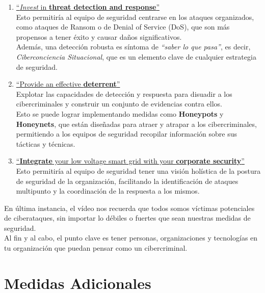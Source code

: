 \begin{enumerate}
   \item \ul{``\textit{Invest} in \textbf{threat detection and response}''}\\
   Esto permitiría al equipo de seguridad centrarse en los ataques organizados, como ataques de Ransom o de Denial of Service (DoS), que son más propensos a tener éxito y causar daños significativos.\\
   Además, una detección robusta es síntoma de \textit{``saber lo que pasa''}, es decir, \textit{Ciberconciencia Situacional}, que es un elemento clave de cualquier estrategia de seguridad.
   \item \ul{``Provide an effective \textbf{deterrent}''}\\
   Explotar las capacidades de detección y respuesta para disuadir a los cibercriminales y construir un conjunto de evidencias contra ellos.\\
   Esto se puede lograr implementando medidas como \textbf{Honeypots} y \textbf{Honeynets}, que están diseñadas para atraer y atrapar a los cibercriminales, permitiendo a los equipos de seguridad recopilar información sobre sus tácticas y técnicas.
   \item \ul{``\textbf{Integrate} your low voltage smart grid with your \textbf{corporate security}''}\\
   Esto permitiría al equipo de seguridad tener una visión holística de la postura de seguridad de la organización, facilitando la identificación de ataques multipunto y la coordinación de la respuesta a los mismos.
\end{enumerate}

En última instancia, el vídeo nos recuerda que todos somos víctimas potenciales de ciberataques, sin importar lo débiles o fuertes que sean nuestras medidas de seguridad.\\
Al fin y al cabo, el punto clave es tener personas, organizaciones y tecnologías en tu organización que puedan pensar como un cibercriminal.

\section{Medidas Adicionales}


